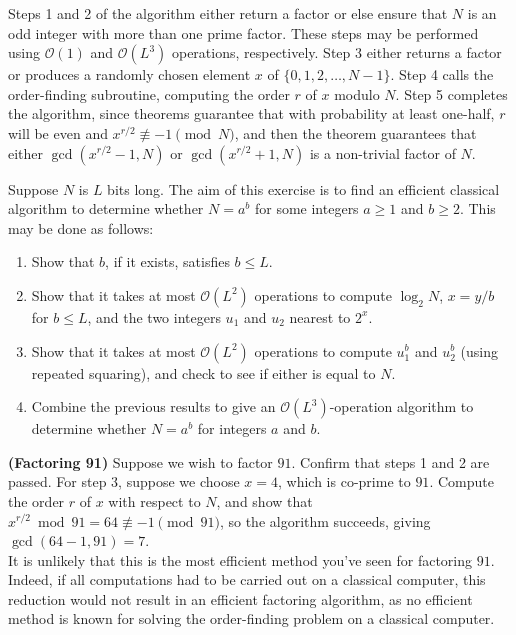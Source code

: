 Steps 1 and 2 of the algorithm either return a factor or else ensure that $N$ is an odd integer with more than one prime factor. These steps may be performed using $\mathcal{O}(1)$ and $\mathcal{O}(L^3)$ operations, respectively. Step 3 either returns a factor or produces a randomly chosen element $x$ of $\{0,1,2,\ldots,N-1\}$. Step 4 calls the order-finding subroutine, computing the order $r$ of $x$ modulo $N$. Step 5 completes the algorithm, since theorems guarantee that with probability at least one-half, $r$ will be even and $x^{r/2} \not\equiv -1 \pmod{N}$, and then the theorem guarantees that either $\gcd(x^{r/2} - 1, N)$ or $\gcd(x^{r/2} + 1, N)$ is a non-trivial factor of $N$.


\begin{example}
    Suppose $N$ is $L$ bits long. The aim of this exercise is to find an efficient classical algorithm to determine whether $N = a^b$ for some integers $a \geq 1$ and $b \geq 2$. This may be done as follows:
    \begin{enumerate}
        \item Show that $b$, if it exists, satisfies $b \leq L$.
        \item Show that it takes at most $\mathcal{O}(L^2)$ operations to compute $\log_2 N$, $x = y/b$ for $b \leq L$, and the two integers $u_1$ and $u_2$ nearest to $2^x$.
        \item Show that it takes at most $\mathcal{O}(L^2)$ operations to compute $u_1^b$ and $u_2^b$ (using repeated squaring), and check to see if either is equal to $N$.
        \item Combine the previous results to give an $\mathcal{O}(L^3)$-operation algorithm to determine whether $N = a^b$ for integers $a$ and $b$.
    \end{enumerate}
\end{example}

\begin{example}
    \textbf{(Factoring 91)} Suppose we wish to factor $91$. Confirm that steps 1 and 2 are passed. For step 3, suppose we choose $x = 4$, which is co-prime to $91$. Compute the order $r$ of $x$ with respect to $N$, and show that $x^{r/2} \bmod 91 = 64 \not\equiv -1 \pmod{91}$, so the algorithm succeeds, giving $\gcd(64 - 1, 91) = 7$.\\
    It is unlikely that this is the most efficient method you've seen for factoring $91$. Indeed, if all computations had to be carried out on a classical computer, this reduction would not result in an efficient factoring algorithm, as no efficient method is known for solving the order-finding problem on a classical computer.
\end{example}

